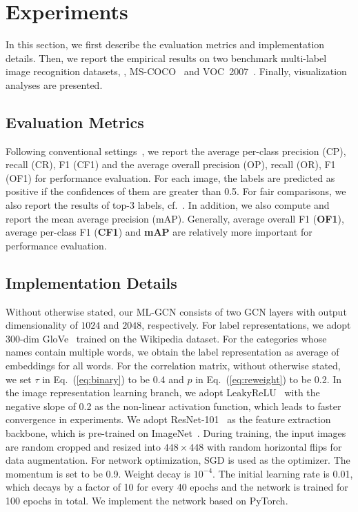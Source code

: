 \documentclass[10pt,twocolumn,letterpaper]{article}
\begin{document}
\section{Experiments}

In this section, we first describe the evaluation metrics and implementation details. Then, we report the empirical results on two benchmark multi-label image recognition datasets, \ie, {MS-COCO}~\cite{coco} and {VOC}~2007~\cite{voc}. Finally, visualization analyses are presented.

\subsection{Evaluation Metrics}

Following conventional settings~\cite{cnn-rnn,multi_evidence,srn}, we report the average per-class precision (CP), recall (CR), F1 (CF1) and the average overall precision (OP), recall (OR), F1 (OF1) for performance evaluation. For each image, the labels are predicted as positive if the confidences of them are greater than 0.5. For fair comparisons, we also report the results of top-3 labels, cf.~\cite{srn,multi_evidence}. In addition, we also compute and report the mean average precision (mAP). Generally, average overall F1 (\textbf{OF1}), average per-class F1 (\textbf{CF1}) and \textbf{mAP} are relatively more important for performance evaluation.

\subsection{Implementation Details}

Without otherwise stated, our ML-GCN consists of two GCN layers with output dimensionality of $1024$ and $2048$, respectively.
For label representations, we adopt $300$-dim GloVe~\cite{glove} trained on the Wikipedia dataset. For the categories whose names contain multiple words, we obtain the label representation as average of embeddings for all words. For the correlation matrix, without otherwise stated, we set $\tau$ in Eq.~(\ref{eq:binary}) to be 0.4 and $p$ in Eq.~(\ref{eq:reweight}) to be 0.2. In the image representation learning branch, we adopt LeakyReLU~\cite{leakyrelu} with the negative slope of 0.2 as the non-linear activation function, which leads to faster convergence in experiments. We adopt ResNet-101~\cite{resnet} as the feature extraction backbone, which is
pre-trained on {ImageNet}~\cite{imagenet}.
During training, the input images are random cropped and resized into $448 \times 448$ with random horizontal flips for data augmentation. For network optimization, SGD is used as the optimizer. The momentum is set to be 0.9. Weight decay is $10^{-4}$. The initial learning rate is 0.01, which decays by a factor of 10 for every 40 epochs and the network is trained for 100 epochs in total. We implement the network based on PyTorch.
\end{document}
